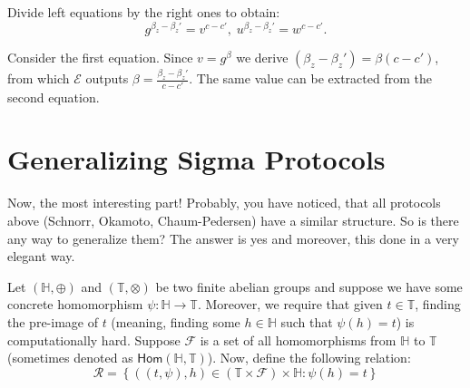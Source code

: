 \documentclass[../lecture-notes.tex]{subfiles}
\begin{document}
Divide left equations by the right ones to obtain:
\begin{equation*}
    g^{\beta_z - \beta_z'} = v^{c-c'}, \; u^{\beta_z - \beta_z'} = w^{c-c'}.
\end{equation*}

Consider the first equation. Since $v=g^{\beta}$ we derive $(\beta_z-\beta_z') = \beta(c-c')$, from which $\mathcal{E}$ outputs $\beta = \frac{\beta_z-\beta_z'}{c-c'}$. The same value can be extracted from the second equation.

\section{Generalizing Sigma Protocols}

Now, the most interesting part! Probably, you have noticed, that all protocols above (Schnorr, Okamoto, Chaum-Pedersen) have a similar structure. So is there any way to generalize them? The answer is yes and moreover, this done in a very elegant way.

Let $(\mathbb{H}, \oplus)$ and $(\mathbb{T}, \otimes)$ be two finite abelian groups and suppose we have some concrete homomorphism $\psi: \mathbb{H} \to \mathbb{T}$. Moreover, we require that given $t \in \mathbb{T}$, finding the pre-image of $t$ (meaning, finding some $h \in \mathbb{H}$ such that $\psi(h)=t$) is computationally hard. Suppose $\mathcal{F}$ is a set of all homomorphisms from $\mathbb{H}$ to $\mathbb{T}$ (sometimes denoted as $\mathsf{Hom}(\mathbb{H}, \mathbb{T})$). Now, define the following relation:
\begin{equation*}
    \mathcal{R} = \left\{ ((t,\psi), h) \in (\mathbb{T} \times \mathcal{F}) \times \mathbb{H}: \psi(h) = t \right\}
\end{equation*}
\end{document}
